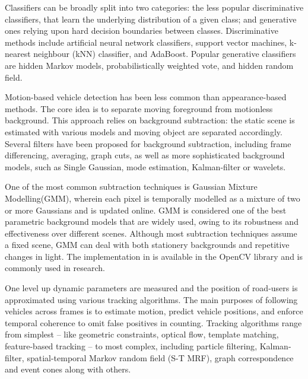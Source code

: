 Classifiers can be broadly split into two categories: the less popular discriminative classifiers, that learn the underlying distribution of a given class; and generative ones relying upon hard decision boundaries between classes\cite{Sivaraman2012}.
Discriminative methods include artificial neural network classifiers\cite{Xia2006}, support vector machines\cite{Cornelis2008}, k-nearest neighbour (kNN) classifier\cite{Morris2006}, and AdaBoost\cite{Khammari2005}.
Popular generative classifiers are hidden Markov models\cite{Jazayeri2011}, probabilistically weighted vote\cite{Lin2012}, and hidden random field\cite{Zhang2011}.

Motion-based vehicle detection has been less common than appearance-based methods.
The core idea is to separate moving foreground from motionless background.
This approach relies on background subtraction: the static scene is estimated with various models and moving object are separated accordingly.
Several filters have been proposed for background subtraction, including frame differencing\cite{Park2007}, averaging\cite{Kanhere2008}, graph cuts\cite{Woodford2009}, as well as more sophisticated background models, such as Single Gaussian\cite{Kumar2003}, mode estimation\cite{Zheng2006}, Kalman-filter\cite{Messelodi2005} or wavelets\cite{Gao2009}. 

One of the most common subtraction techniques is Gaussian Mixture Modelling(GMM)\cite{Niknejad2012, Wang2009,Zhang2016a}, wherein each pixel is temporally modelled as a mixture of two or more Gaussians and is updated online\cite{Stauffer1999,Stauffer2000}.
GMM is considered one of the best parametric background models that are widely used, owing to its robustness and effectiveness over different scenes\cite{Zhang2016}.
Although most subtraction techniques assume a fixed scene, GMM can deal with both stationery backgrounds and repetitive changes in light.
The implementation in \cite{Kaewtrakulpong2001} is available in the OpenCV library and is commonly used in research\cite{OpenCVMog2}.

One level up dynamic parameters are measured and the position of road-users is approximated using various tracking algorithms. 
The main purposes of following vehicles across frames is to estimate  motion, predict vehicle positions, and enforce temporal coherence to omit false positives in counting.
Tracking algorithms range from simplest -- like geometric constraints\cite{Rabe2007}, optical flow\cite{Bhaskar2015}, template matching\cite{Liu2007}, feature-based tracking\cite{Haselhoff2009} -- to most complex, including particle filtering\cite{Danescu2011}, Kalman-filter\cite{Bresson2015}, spatial-temporal Markov random field (S-T MRF)\cite{Zhu2005}, graph correspondence\cite{Lai2010} and event cones\cite{Andrienko2015} along with others. 

